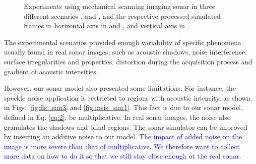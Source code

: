 \documentclass[final,5p,times]{elsarticle}
\begin{document}
\begin{figure}[!ht]
{        \label{fig:msis_sim2}
    }
    \captionsetup{justification=centering}
    \caption{Experiments using mechanical scanning imaging sonar in three
    different scenarios , 
    and , and the respective processed simulated
    frames in horizontal axis in  and
    , and vertical axis in .}
    \label{fig:msis}
\end{figure}

The experimental scenarios provided enough variability of specific phenomena
usually found in real sonar images, such as acoustic shadows, noise
interference, surface irregularities and properties, distortion during
the acquisition process and gradient of acoustic intensities. 

However, our
sonar model also presented some limitations. For instance, the speckle noise
application is restricted to regions with acoustic intensity, as shown in
Figs. \ref{fig:fls_sim3} and \ref{fig:msis_sim1}. This fact is due to our
sonar model, defined in Eq. \ref{eq:2}, be multiplicative. In real sonar
images, the noise also granulates the shadows and blind regions. The sonar
simulator can be improved by inserting an additive noise to our model.
\textcolor{blue}{The impact of added noise on the image is more severe
than that of multiplicative. We therefore want to collect more data on how to do 
it so that we still stay close enough ot the real sonar.}
\end{document}
